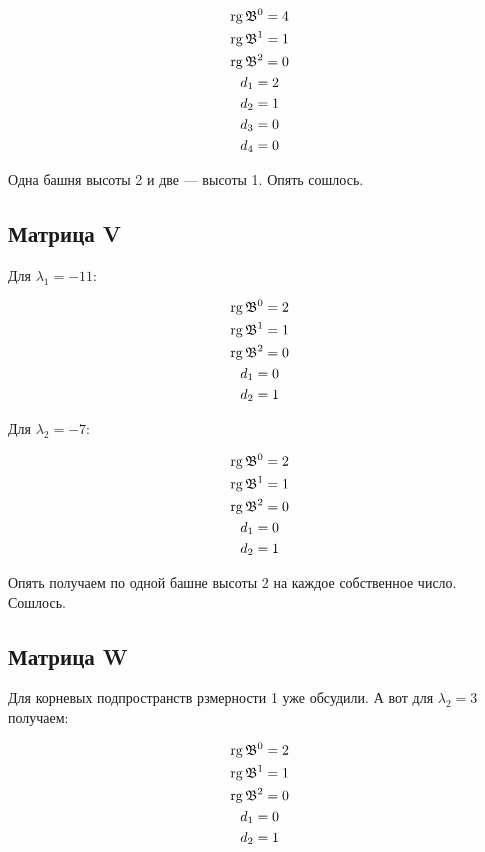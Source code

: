 \documentclass[12pt, a4paper]{article}
\begin{document}
    \begin{gather}
        \operatorname{rg} \mathfrak{B}^{0} = 4 \\
        \operatorname{rg} \mathfrak{B}^{1} = 1 \\
        \operatorname{rg} \mathfrak{B}^{2} = 0 \\
        d_1 = 2 \\ 
        d_2 = 1 \\
        d_3 = 0 \\
        d_4 = 0
    \end{gather}

    Одна башня высоты 2 и две — высоты 1. Опять сошлось.


    \subsection{Матрица V}


    Для $\lambda_1 = -11$:

    \begin{gather}
        \operatorname{rg} \mathfrak{B}^{0} = 2 \\
        \operatorname{rg} \mathfrak{B}^{1} = 1 \\
        \operatorname{rg} \mathfrak{B}^{2} = 0 \\
        d_1 = 0 \\
        d_2 = 1
    \end{gather}

    Для $\lambda_2 = -7$:
    
    \begin{gather}
        \operatorname{rg} \mathfrak{B}^{0} = 2 \\
        \operatorname{rg} \mathfrak{B}^{1} = 1 \\
        \operatorname{rg} \mathfrak{B}^{2} = 0 \\
        d_1 = 0 \\
        d_2 = 1
    \end{gather}

    Опять получаем по одной башне высоты 2 на каждое собственное число. Сошлось.


    \subsection{Матрица W}

    Для корневых подпространств рзмерности 1 уже обсудили. А вот для $\lambda_2 = 3$ получаем:

    \begin{gather}
        \operatorname{rg} \mathfrak{B}^{0} = 2 \\
        \operatorname{rg} \mathfrak{B}^{1} = 1 \\
        \operatorname{rg} \mathfrak{B}^{2} = 0 \\
        d_1 = 0 \\
        d_2 = 1
    \end{gather}
\end{document}
